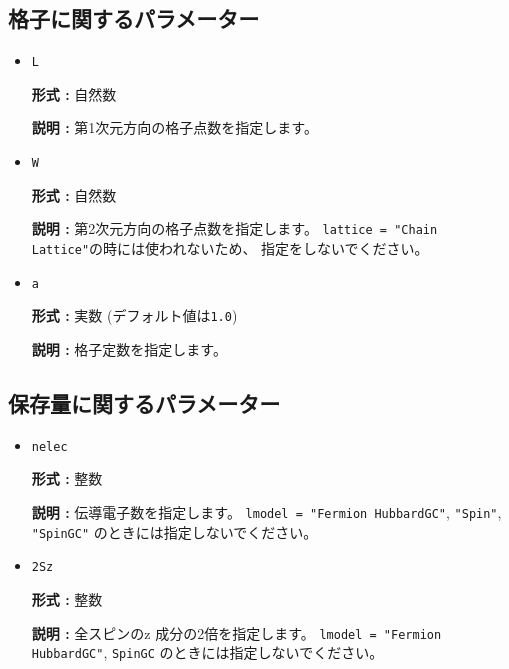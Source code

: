 \subsection{格子に関するパラメーター}

\begin{itemize}
\item \verb|L|

{\bf 形式 :} 自然数

{\bf 説明 :} 第1次元方向の格子点数を指定します。

\item \verb|W|

{\bf 形式 :} 自然数

{\bf 説明 :} 第2次元方向の格子点数を指定します。
\verb|lattice = "Chain Lattice"|の時には使われないため、
指定をしないでください。

\item \verb|a|

{\bf 形式 :} 実数 (デフォルト値は\verb|1.0|)

{\bf 説明 :} 格子定数を指定します。
\end{itemize}

\subsection{保存量に関するパラメーター}

\begin{itemize}
\item \verb|nelec|

{\bf 形式 :} 整数

{\bf 説明 :} 伝導電子数を指定します。
\verb|lmodel = "Fermion HubbardGC"|, \verb|"Spin"|, \verb|"SpinGC"|
のときには指定しないでください。

\item \verb|2Sz|

{\bf 形式 :} 整数

{\bf 説明 :} 全スピンのz 成分の2倍を指定します。
\verb|lmodel = "Fermion HubbardGC"|, \verb|SpinGC|
のときには指定しないでください。
\end{itemize}

